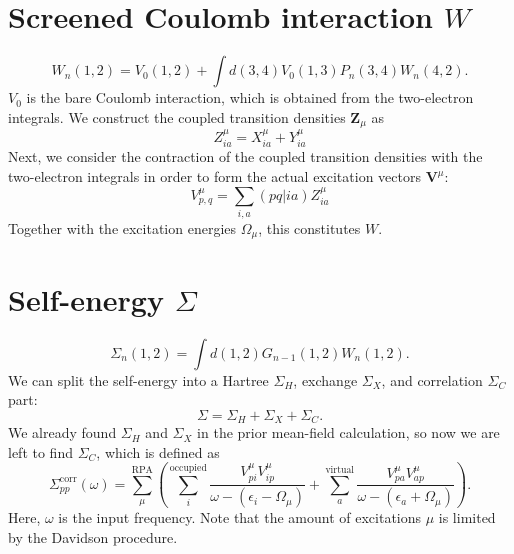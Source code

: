 \documentclass[12pt]{article}
\begin{document}
\section{Screened Coulomb interaction $W$}
\begin{equation}
    W_n(1,2)=V_0(1,2)+\int d(3,4) V_0(1,3) P_n(3,4) W_n(4,2).
\end{equation}
$V_0$ is the bare Coulomb interaction, which is obtained from the two-electron integrals.
We construct the coupled transition densities $\textbf{Z}_{\mu}$ as
\begin{equation}
    {Z}_{ia}^{\mu} = {X}_{ia}^{\mu} + {Y}_{ia}^{\mu}
\end{equation}
Next, we consider the contraction of the coupled transition densities with the two-electron integrals in order to form the actual excitation vectors $\textbf{V}^{\mu}$:
\begin{equation}
    {V}_{p,q}^{\mu} = \sum _{i,a}(pq|ia) Z_{ia}^{\mu}
\end{equation}
Together with the excitation energies $\Omega_{\mu}$, this constitutes $W$.
\section{Self-energy $\Sigma$}
\begin{equation}
    \Sigma_n(1,2)=\int d(1,2) G_{n-1}(1,2) W_n(1,2).
\end{equation}
We can split the self-energy into a Hartree $\Sigma _H$, exchange $\Sigma _X$, and correlation $\Sigma _C$ part:
\begin{equation}
    \Sigma = \Sigma _H + \Sigma _X + \Sigma _C.
\end{equation}
We already found $\Sigma _H$ and $\Sigma _X$ in the prior mean-field calculation, so now we are left to find $\Sigma _C$, which is defined as
\begin{equation}
    \Sigma_{pp}^{\text{corr}}(\omega) = \sum_{\mu }^{\text{RPA}}\left(\sum_{i}^{\text{occupied}} \frac{V_{pi}^{\mu }V_{ip}^{\mu }}{\omega -(\epsilon _{i}-\Omega  _{\mu })}+ \sum_{a}^{\text{virtual}} \frac{V_{pa}^{\mu }V_{ap}^{\mu }}{\omega -(\epsilon _{a}+\Omega  _{\mu })}\right).
\end{equation}
Here, $\omega$ is the input frequency. Note that the amount of excitations $\mu$ is limited by the Davidson procedure.
\end{document}
